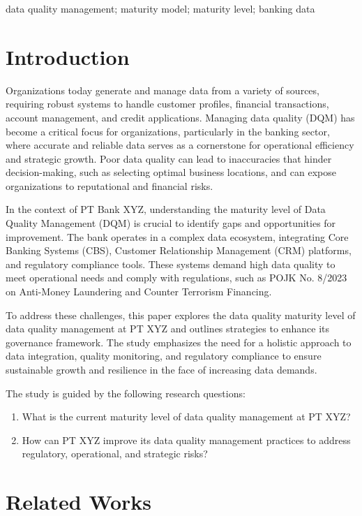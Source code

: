 \documentclass[conference]{IEEEtran}
\begin{document}
\begin{IEEEkeywords}
data quality management; maturity model; maturity level; banking data
\end{IEEEkeywords}

\listoftodos

\section{Introduction}
Organizations today generate and manage data from a variety of sources, requiring robust systems to handle customer profiles, financial transactions, account management, and credit applications. Managing data quality (DQM) has become a critical focus for organizations, particularly in the banking sector, where accurate and reliable data serves as a cornerstone for operational efficiency and strategic growth. Poor data quality can lead to inaccuracies that hinder decision-making, such as selecting optimal business locations, and can expose organizations to reputational and financial risks.

In the context of PT Bank XYZ, understanding the maturity level of Data Quality Management (DQM) is crucial to identify gaps and opportunities for improvement. The bank operates in a complex data ecosystem, integrating Core Banking Systems (CBS), Customer Relationship Management (CRM) platforms, and regulatory compliance tools. These systems demand high data quality to meet operational needs and comply with regulations, such as POJK No. 8/2023 on Anti-Money Laundering and Counter Terrorism Financing.

To address these challenges, this paper explores the data quality maturity level of data quality management at PT XYZ and outlines strategies to enhance its governance framework. The study emphasizes the need for a holistic approach to data integration, quality monitoring, and regulatory compliance to ensure sustainable growth and resilience in the face of increasing data demands.

The study is guided by the following research questions:
\begin{enumerate}
    \item What is the current maturity level of data quality management at PT XYZ?
    \item How can PT XYZ improve its data quality management practices to address regulatory, operational, and strategic risks?
\end{enumerate}


\section{Related Works}
\end{document}
